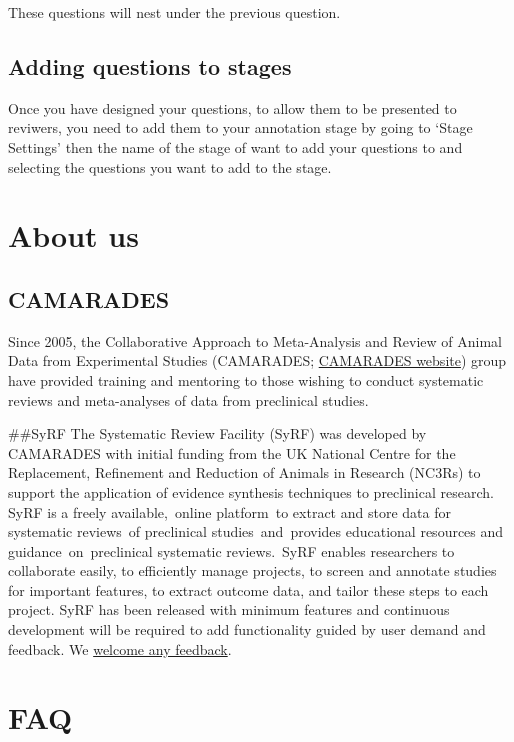 \documentclass[
]{book}
\begin{document}
These questions will nest under the previous question.

\hypertarget{adding-questions-to-stages}{%
\section{Adding questions to stages}\label{adding-questions-to-stages}}

Once you have designed your questions, to allow them to be presented to reviwers, you need to add them to your annotation stage by going to `Stage Settings' then the name of the stage of want to add your questions to and selecting the questions you want to add to the stage.

\hypertarget{about}{%
\chapter{About us}\label{about}}

\hypertarget{camarades}{%
\section{CAMARADES}\label{camarades}}

Since 2005, the Collaborative Approach to Meta-Analysis and Review of Animal Data from Experimental Studies (CAMARADES; \href{https://www.ed.ac.uk/clinical-brain-sciences/research/camarades}{CAMARADES website}) group have provided training and mentoring to those wishing to conduct systematic reviews and meta-analyses of data from preclinical studies.

\#\#SyRF
The Systematic Review Facility (SyRF) was developed by CAMARADES with initial funding from the UK National Centre for the Replacement, Refinement and Reduction of Animals in Research (NC3Rs) to support the application of evidence synthesis techniques to preclinical research. SyRF is a freely available,~online platform~to extract and store data for systematic reviews~of preclinical studies~and~provides educational resources and guidance~on~preclinical systematic reviews.~SyRF enables researchers to collaborate easily, to efficiently manage projects, to screen and annotate studies for important features, to extract outcome data, and tailor these steps to each project. SyRF has been released with minimum features and continuous development will be required to add functionality guided by user demand and feedback. We \href{mailto:syrf.info@ed.ac.uk}{welcome any feedback}.

\hypertarget{faq}{%
\chapter{FAQ}\label{faq}}
\end{document}
